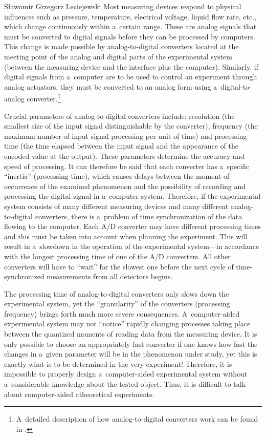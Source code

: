 \begin{artengenv}{Sławomir Grzegorz Leciejewski}
Most measuring devices respond to physical influences such as pressure, temperature, electrical voltage, liquid flow rate, etc., which change continuously within a~certain range. These are analog signals that must be converted to digital signals before they can be processed by computers. This change is made possible by analog-to-digital converters located at the meeting point of the analog and digital parts of the experimental system (between the measuring device and the interface plus the computer). Similarly, if digital signals from a~computer are to be used to control an experiment through analog actuators, they must be converted to an analog form using a~digital-to-analog converter.\footnote{A~detailed description of how analog-to-digital converters work can be found in 
\parencite[][]{pelgrom_analog--digital_2022}.%
}



Crucial parameters of analog-to-digital converters include: resolution (the smallest size of the input signal distinguishable by the converter), frequency (the maximum number of input signal processing per unit of time) and processing time (the time elapsed between the input signal and the appearance of the encoded value at the output). These parameters determine the accuracy and speed of processing. It can therefore be said that each converter has a~specific ``inertia'' (processing time), which causes delays between the moment of occurrence of the examined phenomenon and the possibility of recording and processing the digital signal in a~computer system. Therefore, if the experimental system consists of many different measuring devices and many different analog-to-digital converters, there is a~problem of time synchronization of the data flowing to the computer. Each A/D converter may have different processing times and this must be taken into account when planning the experiment. This will result in a~slowdown in the operation of the experimental system---in accordance with the longest processing time of one of the A/D converters. All other converters will have to ``wait'' for the slowest one before the next cycle of time-synchronized measurements from all detectors begins.



The processing time of analog-to-digital converters only slows down the experimental system, yet the ``granularity'' of the converters (processing frequency) brings forth much more severe consequences. A~computer-aided experimental system may not ``notice'' rapidly changing processes taking place between the quantized moments of reading data from the measuring device. It is only possible to choose an appropriately fast converter if one knows how fast the changes in a~given parameter will be in the phenomenon under study, yet this is exactly what is to be determined in the very experiment! Therefore, it is impossible to properly design a~computer-aided experimental system without a~considerable knowledge about the tested object. Thus, it is difficult to talk about computer-aided atheoretical experiments.




\end{artengenv}
